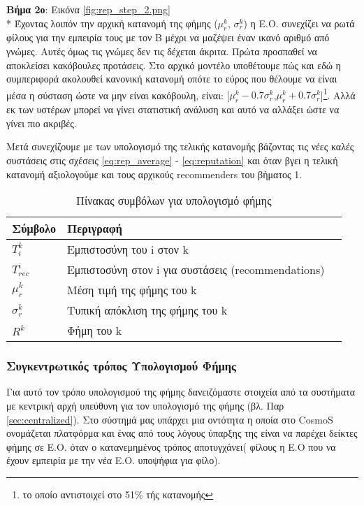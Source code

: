 \textbf{Βήμα 2ο}: Εικόνα \ref{fig:rep_step_2.png} \\*
 Έχοντας λοιπόν την αρχική κατανομή της φήμης ($\mu_r^k$, $\sigma_r^k$) η Ε.Ο. συνεχίζει να ρωτά φίλους για την εμπειρία τους με τον Β μέχρι να μαζέψει έναν ικανό αριθμό από γνώμες. Αυτές όμως τις γνώμες δεν τις δέχεται άκριτα. Πρώτα προσπαθεί να αποκλείσει κακόβουλες προτάσεις. Στο αρχικό μοντέλο υποθέτουμε πώς και εδώ η συμπεριφορά ακολουθεί κανονική κατανομή οπότε το εύρος που θέλουμε να είναι μέσα η σύσταση ώστε να μην είναι κακόβουλη, είναι: [$\mu_r^k-0.7\sigma_r^k$,$\mu_r^k+0.7\sigma_r^k$]\footnote{το οποίο αντιστοιχεί στο 51\%  τής κατανομής}. Αλλά εκ των υστέρων μπορεί να γίνει στατιστική ανάλυση και αυτό να αλλάξει ώστε να γίνει πιο ακριβές.

Μετά συνεχίζουμε με των υπολογισμό της τελικής κατανομής βάζοντας τις νέες καλές συστάσεις στις σχέσεις \ref{eq:rep_average} - \ref{eq:reputation}  και όταν βγει η τελική κατανομή αξιολογούμε και τους αρχικούς recommenders του βήματος 1.





\begin{table}[H]
    \centering
    \begin{tabular}{ | l | l | l | }
        \hline
        Σύμβολο & Περιγραφή \\ \hline \hline
        $T_i^k$ & Εμπιστοσύνη του i στον k  \\ \hline
        $T_{rec}^i$ & Εμπιστοσύνη στον i για συστάσεις (recommendations) \\ \hline
        $\mu_r^k$ 	& Μέση τιμή της φήμης του k\\ \hline
        $\sigma_r^k$    & Τυπική απόκλιση της φήμης του k \\ \hline
        $R^k$   & Φήμη του k \\ \hline
            \end{tabular}
    \caption{Πίνακας συμβόλων για υπολογισμό φήμης}
    \label{tab:symbols_trust}
\end{table}
\subsubsection{Συγκεντρωτικός τρόπος Υπολογισμού Φήμης}

Για αυτό τον τρόπο υπολογισμού της φήμης δανειζόμαστε στοιχεία από τα συστήματα με κεντρική αρχή υπεύθυνη για τον υπολογισμό της φήμης (βλ. Παρ \ref{sec:centralized}). Στο σύστημά μας υπάρχει μια οντότητα η οποία στο CosmoS ονομάζεται πλατφόρμα και ένας από τους λόγους ύπαρξης της είναι να παρέχει δείκτες φήμης σε Ε.Ο. όταν ο κατανεμημένος τρόπος αποτυγχάνει( φίλους η Ε.Ο που να έχουν εμπειρία με την νέα Ε.Ο. υποψήφια για φίλο).

